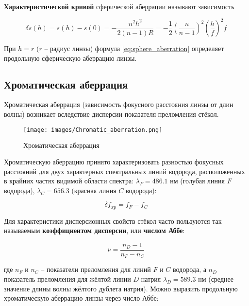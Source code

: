 	\textbf{Характеристической кривой} сферической аберрации называют зависимость
	
	\begin{equation} \label{eq:sphere_aberration}
		\delta s(h) = s(h) - s(0) = - \frac{n^2 h^2}{2(n - 1) R} = - \frac{1}{2} \left( \frac{n}{n - 1} \right)^2 \left( \frac{h}{f} \right)^2 f
	\end{equation}
	
	При $h = r$ ($r$ -- радиус линзы) формула \eqref{eq:sphere_aberration} определяет продольную сферическую аберрацию линзы.
	
	\subsection*{Хроматическая аберрация}
	
	Хроматическая аберрация (зависимость фокусного расстояния линзы от длин волны) возникает вследствие дисперсии показателя преломления стёкол.
	
	\begin{wrapfigure}{l}{0.45\textwidth}
		\texttt{[image: images/Chromatic\_aberration.png]}
		\caption{Хроматическая аберрация}
		\label{Chromatic_aberration}
	\end{wrapfigure}

	Хроматическую аберрацию принято характеризовать разностью фокусных расстояний для двух характерных спектральных линий водорода, расположенных в крайних частях видимой области спектра: $\lambda_F = 486.1$ нм (голубая линия $F$ водорода), $\lambda_C = 656.3$ (красная линия $C$ водорода):
	
	\begin{equation} \label{eq:chromatic_aberation}
		\delta f_{xp} = f_F - f_C
	\end{equation}

	Для характеристики дисперсионных свойств стёкол часто пользуются так называемым \textbf{коэффициентом дисперсии}, или \textbf{числом Аббе}:
	
	\begin{equation} \label{eq:Abbe_constant}
		\nu = \frac{n_D - 1}{n_F - n_C}
	\end{equation}
	
	где $n_F$ и $n_C$ -- показатели преломления для линий $F$ и $C$ водорода, а $n_D$ показатель преломления для жёлтой линии $D$ натрия $\lambda_D = 589.3$ нм (среднее значение длины волны жёлтого дублета натрия). Можно выразить продольную хроматическую аберрацию линзы через число Аббе:
	
